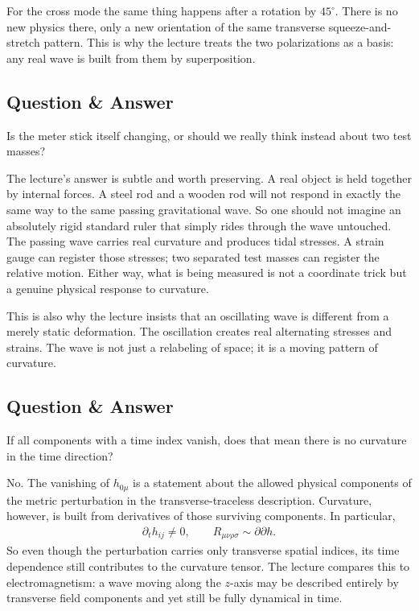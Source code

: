 For the cross mode the same thing happens after a rotation by \(45^\circ\). There is no new physics there, only a new orientation of the same transverse squeeze-and-stretch pattern. This is why the lecture treats the two polarizations as a basis: any real wave is built from them by superposition.

\subsection{Question \& Answer}

Is the meter stick itself changing, or should we really think instead about two test masses?

The lecture's answer is subtle and worth preserving. A real object is held together by internal forces. A steel rod and a wooden rod will not respond in exactly the same way to the same passing gravitational wave. So one should not imagine an absolutely rigid standard ruler that simply rides through the wave untouched. The passing wave carries real curvature and produces tidal stresses. A strain gauge can register those stresses; two separated test masses can register the relative motion. Either way, what is being measured is not a coordinate trick but a genuine physical response to curvature.

This is also why the lecture insists that an oscillating wave is different from a merely static deformation. The oscillation creates real alternating stresses and strains. The wave is not just a relabeling of space; it is a moving pattern of curvature.

\subsection{Question \& Answer}

If all components with a time index vanish, does that mean there is no curvature in the time direction?

No. The vanishing of \(h_{0\mu}\) is a statement about the allowed physical components of the metric perturbation in the transverse-traceless description. Curvature, however, is built from derivatives of those surviving components. In particular,
\begin{align}
\partial_t h_{ij}\neq 0,
\qquad
R_{\mu\nu\rho\sigma}\sim \partial\partial h.
\end{align}
So even though the perturbation carries only transverse spatial indices, its time dependence still contributes to the curvature tensor. The lecture compares this to electromagnetism: a wave moving along the \(z\)-axis may be described entirely by transverse field components and yet still be fully dynamical in time.

